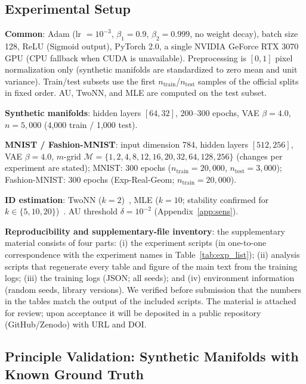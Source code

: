 \documentclass[make,article,submit,pdftex,moreauthors]{Definitions/mdpi}
\begin{document}
\subsection{Experimental Setup}\label{sec:exp_setup}

\textbf{Common}: Adam (lr $= 10^{-3}$, $\beta_1 = 0.9$, $\beta_2 = 0.999$,
no weight decay), batch size 128, ReLU (Sigmoid output), PyTorch 2.0, a
single NVIDIA GeForce RTX 3070 GPU (CPU fallback when CUDA is unavailable).
Preprocessing is $[0,1]$ pixel normalization only (synthetic manifolds are
standardized to zero mean and unit variance).
Train/test subsets use the first $n_{\mathrm{train}}$/$n_{\mathrm{test}}$
samples of the official splits in fixed order.
AU, TwoNN, and MLE are computed on the test subset.

\textbf{Synthetic manifolds}: hidden layers $[64, 32]$, 200--300 epochs,
VAE $\beta = 4.0$, $n = 5{,}000$ (4{,}000 train / 1{,}000 test).

\textbf{MNIST / Fashion-MNIST}: input dimension 784, hidden layers
$[512, 256]$, VAE $\beta = 4.0$, $m$-grid
$\mathcal{M} = \{1, 2, 4, 8, 12, 16, 20, 32, 64, 128, 256\}$ (changes per
experiment are stated); MNIST: 300 epochs
($n_{\mathrm{train}} = 20{,}000$, $n_{\mathrm{test}} = 3{,}000$);
Fashion-MNIST: 300 epochs (Exp-Real-Geom; $n_{\mathrm{train}} = 20{,}000$).

\textbf{ID estimation}: TwoNN ($k = 2$)~\cite{facco2017twonn}, MLE
($k = 10$; stability confirmed for $k \in \{5, 10, 20\}$)~\cite{levina2005mle}.
AU threshold $\delta = 10^{-2}$ (Appendix~\ref{app:sens}).

\textbf{Reproducibility and supplementary-file inventory}:
the supplementary material consists of four parts:
(i) the experiment scripts (in one-to-one correspondence with the experiment
names in Table~\ref{tab:exp_list});
(ii) analysis scripts that regenerate every table and figure of the main
text from the training logs;
(iii) the training logs (JSON; all seeds); and
(iv) environment information (random seeds, library versions).
We verified before submission that the numbers in the tables match the
output of the included scripts.
The material is attached for review; upon acceptance it will be deposited in
a public repository (GitHub/Zenodo) with URL and DOI.

\subsection{Principle Validation: Synthetic Manifolds with Known Ground Truth}\label{sec:exp_syn}
\end{document}
